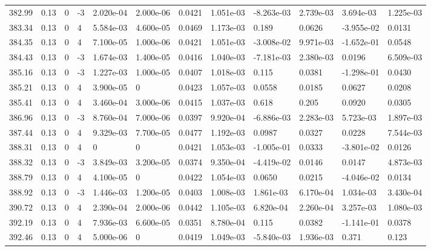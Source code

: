 \documentclass[preview]{standalone}
\begin{document}
{{{{{{{{{{{{{{{{{{\begin{tabular}{L{1.2cm}C{1.2cm} C{0.3cm}C{0.5cm} C{1.4cm}C{1.4cm} C{1.4cm}C{1.4cm} C{1.6cm}C{1.6cm} C{1.6cm}C{1.6cm}}
  382.99  &  0.13  & 0     & -3 &  2.020e-04  & 2.000e-06  &  0.0421&   1.051e-03& -8.263e-03 & 2.739e-03   &  3.694e-03 & 1.225e-03  \\ 
  383.34  &  0.13  & 0     &  4 &  5.584e-03  & 4.600e-05  &  0.0469&   1.173e-03& 0.189 & 0.0626   &  -3.955e-02 & 0.0131  \\ 
  384.35  &  0.13  & 0     &  4 &  7.100e-05  & 1.000e-06  &  0.0421&   1.051e-03& -3.008e-02 & 9.971e-03   &  -1.652e-01 & 0.0548  \\ 
  384.43  &  0.13  & 0     & -3 &  1.674e-03  & 1.400e-05  &  0.0416&   1.040e-03& -7.181e-03 & 2.380e-03   &  0.0196 & 6.509e-03  \\ 
  385.16  &  0.13  & 0     & -3 &  1.227e-03  & 1.000e-05  &  0.0407&   1.018e-03& 0.115 & 0.0381   &  -1.298e-01 & 0.0430  \\ 
  385.21  &  0.13  & 0     &  4 &  3.900e-05  & 0  &  0.0423&   1.057e-03& 0.0558 & 0.0185   &  0.0627 & 0.0208  \\ 
  385.41  &  0.13  & 0     &  4 &  3.460e-04  & 3.000e-06  &  0.0415&   1.037e-03& 0.618 & 0.205   &  0.0920 & 0.0305  \\ 
  386.96  &  0.13  & 0     & -3 &  8.760e-04  & 7.000e-06  &  0.0397&   9.920e-04& -6.886e-03 & 2.283e-03   &  5.723e-03 & 1.897e-03  \\ 
  387.44  &  0.13  & 0     &  4 &  9.329e-03  & 7.700e-05  &  0.0477&   1.192e-03& 0.0987 & 0.0327   &  0.0228 & 7.544e-03  \\ 
  388.31  &  0.13  & 0     &  4 &  0  & 0  &  0.0421&   1.053e-03& -1.005e-01 & 0.0333   &  -3.801e-02 & 0.0126  \\ 
  388.32  &  0.13  & 0     & -3 &  3.849e-03  & 3.200e-05  &  0.0374&   9.350e-04& -4.419e-02 & 0.0146   &  0.0147 & 4.873e-03  \\ 
  388.79  &  0.13  & 0     &  4 &  4.100e-05  & 0  &  0.0422&   1.054e-03& 0.0650 & 0.0215   &  -4.046e-02 & 0.0134  \\ 
  388.92  &  0.13  & 0     & -3 &  1.446e-03  & 1.200e-05  &  0.0403&   1.008e-03& 1.861e-03 & 6.170e-04   &  1.034e-03 & 3.430e-04  \\ 
  390.72  &  0.13  & 0     &  4 &  2.390e-04  & 2.000e-06  &  0.0442&   1.105e-03& 6.820e-04 & 2.260e-04   &  3.257e-03 & 1.080e-03  \\ 
  392.19  &  0.13  & 0     &  4 &  7.936e-03  & 6.600e-05  &  0.0351&   8.780e-04& 0.115 & 0.0382   &  -1.141e-01 & 0.0378  \\ 
  392.46  &  0.13  & 0     &  4 &  5.000e-06  & 0  &  0.0419&   1.049e-03& -5.840e-03 & 1.936e-03   &  0.371 & 0.123  \\ 

\end{tabular}}}}}}}}}}}}}}}}}}}
\end{document}
